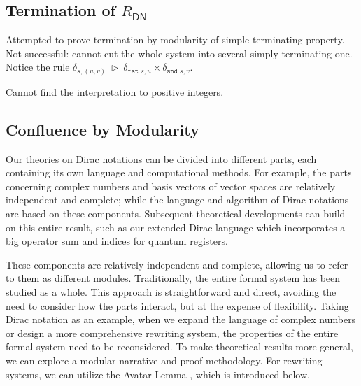 \documentclass[manuscript, review, timestamp]{acmart}
\newcommand*{\fst}{\texttt{fst }}
\newcommand*{\snd}{\texttt{snd }}
\newcommand*{\reduce}{\ \triangleright\ }
\begin{document}



\subsection{Termination of $R_\textsf{DN}$}

Attempted to prove termination by modularity of simple terminating property. Not successful: cannot cut the whole system into several simply terminating one. Notice the rule $\delta_{s, (u, v)} \reduce \delta_{\fst s, u} \times \delta_{\snd s, v}$.

Cannot find the interpretation to positive integers.



\subsection{Confluence by Modularity}
\label{sec: conf-modular}

Our theories on Dirac notations can be divided into different parts, each containing its own language and computational methods. For example, the parts concerning complex numbers and basis vectors of vector spaces are relatively independent and complete; while the language and algorithm of Dirac notations are based on these components. Subsequent theoretical developments can build on this entire result, such as our extended Dirac language which incorporates a big operator sum and indices for quantum registers.

These components are relatively independent and complete, allowing us to refer to them as different modules. Traditionally, the entire formal system has been studied as a whole. This approach is straightforward and direct, avoiding the need to consider how the parts interact, but at the expense of flexibility. Taking Dirac notation as an example, when we expand the language of complex numbers or design a more comprehensive rewriting system, the properties of the entire formal system need to be reconsidered. 
To make theoretical results more general, we can explore a modular narrative and proof methodology. For rewriting systems, we can utilize the Avatar Lemma \cite{Arrighi2005}\cite{Arrighi2017}, which is introduced below.
\end{document}
